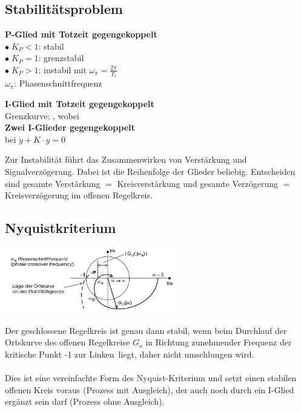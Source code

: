 
	\newpage

	\subsection{Stabilitätsproblem }
	\begin{multicols}{2}	
        
        \textbf{P-Glied mit Totzeit gegengekoppelt }\\
        	$\bullet \; K_P < 1$: stabil\\
        	$\bullet \; K_P = 1$: grenzstabil\\
        	$\bullet \; K_P > 1$: instabil mit $\omega_{\pi} = \frac{2\pi}{T_t}$\\
        	$\omega_\pi$: Phasenschnittfrequenz
        	
       	\columnbreak
        	
		\textbf{I-Glied mit Totzeit gegengekoppelt }\\
			Grenzkurve: , wobei \\
        
        \textbf{Zwei I-Glieder gegengekoppelt }\\
        	bei $\ddot{y} + K \cdot y = 0$
	\end{multicols}
	Zur Instabilität führt das Zusammenwirken von Verstärkung und Signalverzögerung. Dabei ist die Reihenfolge der Glieder beliebig. Entscheiden sind gesamte Verstärkung $=$ Kreisverstärkung und gesamte Verzögerung $=$ Kreisverzögerung im offenen Regelkreis.

	\subsection{Nyquistkriterium }
		\begin{minipage}{8cm}
			\includegraphics[width = 7.5cm]{./images/Nyquistkurve}
		\end{minipage}
		\begin{minipage}{10cm}
			Der geschlossene Regelkreis ist genau dann stabil, wenn beim Durchlauf der
			Ortskurve des offenen Regelkreise $G_o$ in Richtung zunehmender Frequenz der kritische Punkt -1 \glqq zur Linken\grqq\ liegt, daher nicht umschlungen wird. \\ \\ 
			Dies ist eine vereinfachte Form des Nyquist-Kriterium und setzt einen stabilen offenen Kreis voraus (Prozess mit Ausgleich), der auch noch durch ein I-Glied ergänzt sein darf (Prozess ohne Ausgleich).
		\end{minipage}
		 
